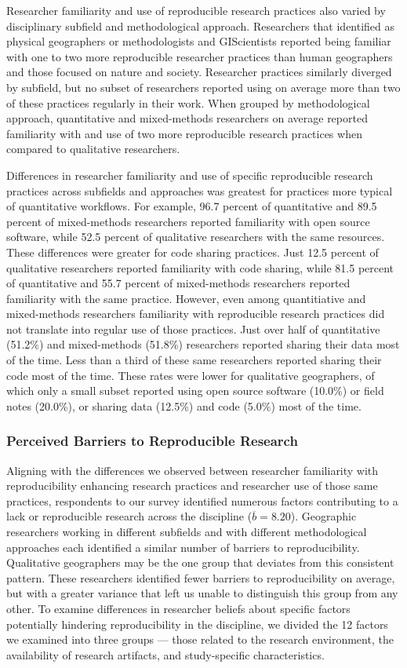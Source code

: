 \documentclass[]{interact}
\theoremstyle{plain}%
\theoremstyle{definition}
\theoremstyle{remark}
\begin{document}
Researcher familiarity and use of reproducible research practices also varied by disciplinary subfield and methodological approach. 
Researchers that identified as physical geographers or methodologists and GIScientists reported being familiar with one to two more reproducible researcher practices than human  geographers and those focused on nature and society.
Researcher practices similarly diverged by subfield, but no subset of researchers reported using on average more than two of these practices regularly in their work.  
When grouped by methodological approach, quantitative and mixed-methods researchers on average reported familiarity with and use of two more reproducible research practices when compared to qualitative researchers.

Differences in researcher familiarity and use of specific reproducible research practices across subfields and approaches was greatest for practices more typical of quantitative workflows. 
For example, 96.7 percent of quantitative and 89.5 percent of mixed-methods researchers reported familiarity with open source software, while 52.5 percent of qualitative researchers with the same resources.
These differences were greater for code sharing practices. 
Just 12.5 percent of qualitative researchers reported familiarity with code sharing, while 81.5 percent of quantitative and 55.7 percent of mixed-methods researchers reported familiarity with the same practice.
However, even among quantitiative and mixed-methods researchers familiarity with reproducible research practices did not translate into regular use of those practices.
Just over half of quantitative (51.2\%) and mixed-methods (51.8\%) researchers reported sharing their data most of the time.
Less than a third of these same researchers reported sharing their code most of the time. 
These rates were lower for qualitative geographers, of which only a small subset reported using open source software (10.0\%) or field notes (20.0\%), or sharing data (12.5\%) and code (5.0\%) most of the time.

\subsubsection*{Perceived Barriers to Reproducible Research}
Aligning with the differences we observed between researcher familiarity with reproducibility enhancing research practices and researcher use of those same practices, respondents to our survey identified numerous factors contributing to a lack or reproducible research across the discipline ($\overline{b}=8.20$). 
Geographic researchers working in different subfields and with different methodological approaches each identified a similar number of barriers to reproducibility.
Qualitative geographers may be the one group that deviates from this consistent pattern. 
These researchers identified fewer barriers to reproducibility on average, but with a greater variance that left us unable to distinguish this group from any other.
To examine differences in researcher beliefs about specific factors potentially hindering reproducibility in the discipline, we divided the 12 factors we examined into three groups --- those related to the research environment, the availability of research artifacts, and study-specific characteristics. 
\end{document}
